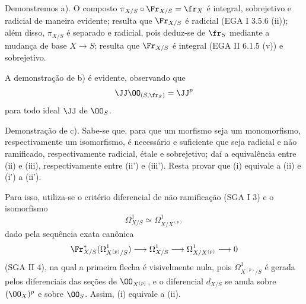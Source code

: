 Demonstremos a). O composto $\pi_{X/S}\circ\Fr_{X/S}=\fr_X$ é integral, sobrejetivo e radicial de maneira evidente; resulta que $\Fr_{X/S}$ é radicial (EGA I 3.5.6 (ii)); além disso, $\pi_{X/S}$ é separado e radicial, pois deduz-se de $\fr_S$ mediante a mudança de base $X\to S$; resulta que $\Fr_{X/S}$ é integral (EGA II 6.1.5 (v)) e sobrejetivo.

A demonstração de b) é evidente, observando que
\[
\JJ\OO_{(S,\fr_S)}=\JJ^p
\]
para todo ideal $\JJ$ de $\OO_S$.

Demonstração de c). Sabe-se que, para que um morfismo seja um monomorfismo, respectivamente um isomorfismo, é necessário e suficiente que seja radicial e não ramificado, respectivamente radicial, étale e sobrejetivo; daí a equivalência entre (ii) e (iii), respectivamente entre (ii') e (iii'). Resta provar que (i) equivale a (ii) e (i') a (ii').

Para isso, utiliza-se o critério diferencial de não ramificação (SGA I 3) e o isomorfismo
\[
\Omega^1_{X/S}\simeq \Omega^1_{X/X^{(p)}}
\]
dado pela sequência exata canônica
\[
\Fr_{X/S}^*(\Omega^1_{X^{(p)}/S})\longrightarrow \Omega^1_{X/S}
\longrightarrow \Omega^1_{X/X^{(p)}}\longrightarrow 0
\]
(SGA II 4), na qual a primeira flecha é visivelmente nula, pois $\Omega^1_{X^{(p)}/S}$ é gerada pelos diferenciais das seções de $\OO_{X^{(p)}}$, e o diferencial $d_{X/S}$ se anula sobre $(\OO_X)^p$ e sobre $\OO_S$. Assim, (i) equivale a (ii).
